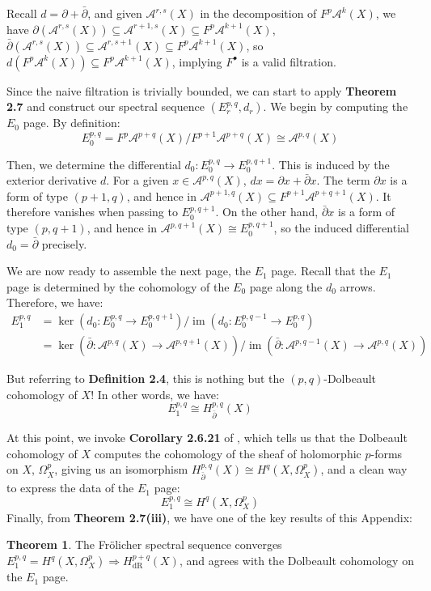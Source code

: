 \documentclass[11pt]{article}
\newcommand{\image}{\operatorname{im}}
\theoremstyle{definition}
\newtheorem{theorem}[equation]{Theorem}
\numberwithin{theorem}{section} %
\numberwithin{equation}{section} %
\begin{document}
\noindent Recall $d=\partial + \bar\partial$, and given $\mathcal{A}^{r,s}(X)$ in the decomposition of $F^p\mathcal{A}^k(X)$, we have $\partial\left(\mathcal{A}^{r,s}(X)\right) \subseteq \mathcal{A}^{r+1,s}(X) \subseteq F^p \mathcal{A}^{k+1}(X)$, $\bar\partial\left(\mathcal{A}^{r,s}(X)\right) \subseteq \mathcal{A}^{r,s+1}(X) \subseteq F^p \mathcal{A}^{k+1}(X)$, so $d\left(F^p\mathcal{A}^k(X)\right) \subseteq F^p \mathcal{A}^{k+1}(X)$, implying $F^\bullet$ is a valid filtration. 

\medskip

\noindent Since the naive filtration is trivially bounded, we can start to apply \textbf{Theorem 2.7} and construct our spectral sequence $\left(E_r^{p,q}, d_r\right)$. We begin by computing the $E_0$ page. By definition:
$$
E_0^{p,q} = F^p\mathcal{A}^{p+q}(X) / F^{p+1}\mathcal{A}^{p+q}(X) \cong  \mathcal{A}^{p,q}(X)
$$

\noindent Then, we determine the differential $d_0:E_0^{p,q} \to E_0^{p,q+1}$. This is induced by the exterior derivative $d$. For a given $x\in \mathcal{A}^{p,q}(X)$, $dx = \partial x  + \bar\partial x$. The term $\partial x$ is a form of type $(p+1,q)$, and hence in $\mathcal{A}^{p+1,q}(X) \subseteq F^{p+1}\mathcal{A}^{p+q+1}(X)$. It therefore vanishes when passing to $E_0^{p,q+1}$. On the other hand, $\bar\partial x$ is a form of type $(p,q+1)$, and hence in $\mathcal{A}^{p,q+1}(X) \cong E_0^{p,q+1}$, so the induced differential $d_0 = \bar\partial$ precisely. 

\medskip

\noindent We are now ready to assemble the next page, the $E_1$ page. Recall that the $E_1$ page is determined by the cohomology of the $E_0$ page along the $d_0$ arrows. Therefore, we have:
\begin{align*}
E_1^{p,q} &= \ker \left(d_0:E_0^{p,q} \to E_0^{p,q+1}\right) / \image \left(d_0: E_0^{p,q-1}\to E_0^{p,q}\right) \\
&= \ker\left(\bar\partial: \mathcal{A}^{p,q}(X)\to \mathcal{A}^{p,q+1}(X) \right) / \image \left(\bar\partial: \mathcal{A}^{p,q-1}(X)\to \mathcal{A}^{p,q}(X) \right)
\end{align*}

\noindent But referring to \textbf{Definition 2.4}, this is nothing but the $(p,q)$-Dolbeault cohomology of $X$! In other words, we have:
$$
E_1^{p,q} \cong H_{\bar\partial}^{p,q}(X)
$$

\noindent At this point, we invoke \textbf{Corollary 2.6.21} of \cite{Huybrechts2005}, which tells us that the Dolbeault cohomology of $X$ computes the cohomology of the sheaf of holomorphic $p$-forms on $X$, $\Omega_X^p$, giving us an isomorphism $H_{\bar\partial}^{p,q}(X)\cong H^q\left(X,\Omega_X^p\right)$, and a clean way to express the data of the $E_1$ page:
$$
E_1^{p,q} \cong H^q\left(X,\Omega_X^p\right)
$$
Finally, from \textbf{Theorem 2.7(iii)}, we have one of the key results of this Appendix:
\begin{theorem}
    The Fr\"olicher spectral sequence converges $E_1^{p,q} = H^q\left(X,\Omega_X^p\right) \Rightarrow H^{p+q}_\mathrm{dR}(X)$, and agrees with the Dolbeault cohomology on the $E_1$ page. 
\end{theorem}
\end{document}
